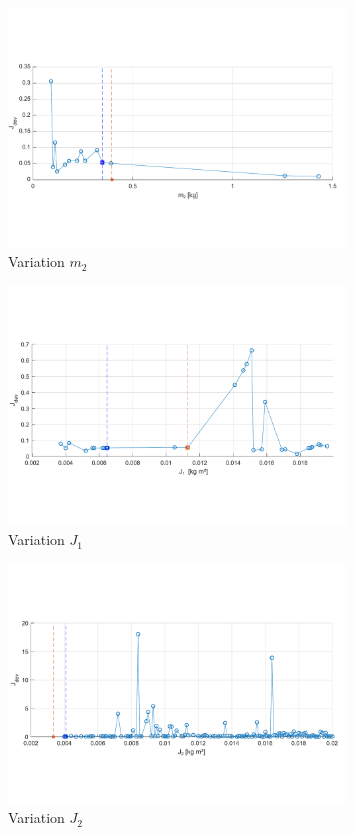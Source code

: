 \begin{figure}
	\centering
		\includegraphics[width=0.8\textwidth]{Bilder/Trajektorien/m2.pdf}
	\caption{Variation $m_2$}
	\label{fig:m2}
\end{figure}

\begin{figure}
	\centering
		\includegraphics[width=0.8\textwidth]{Bilder/Trajektorien/J1.pdf}
	\caption{Variation $J_1$}
	\label{fig:J1}
\end{figure}

\begin{figure}
	\centering
		\includegraphics[width=0.8\textwidth]{Bilder/Trajektorien/J2.pdf}
	\caption{Variation $J_2$}
	\label{fig:J2}
\end{figure}


